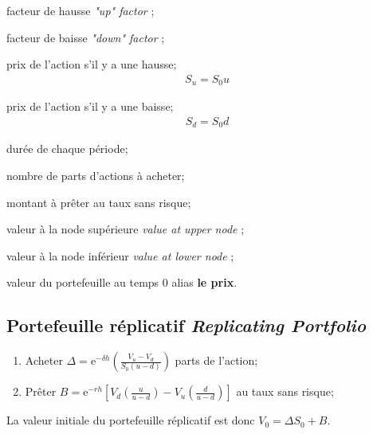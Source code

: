 \documentclass[10pt, french]{article}
\begin{document}
\begin{multicols*}{2}
\begin{distributions}
\begin{description}[leftmargin = *]
	\item[$u$]	facteur de hausse \og \textit{"up" factor} \fg{};
	\item[$d$]	facteur de baisse \og \textit{"down" factor} \fg{};	
	\item[$S_{u}$]	prix de l'action s'il y a une hausse;
		\begin{align*}
		S_{u} = S_{0} u
		\end{align*}
	\item[$S_{d}$]	prix de l'action s'il y a une baisse;
		\begin{align*}
		S_{d} = S_{0} d
		\end{align*}
	\item[$h$]	durée de chaque période;
	\item[$\Delta$]	nombre de parts d'actions à acheter;
	\item[$B$]	montant à prêter au taux sans risque;
	\item[$V_{u}$]	valeur à la node supérieure \og \textit{value at upper node} \fg{};
	\item[$V_{d}$]	valeur à la node inférieur \og \textit{value at lower node} \fg{};
	\item[$V_{0}$]	valeur du portefeuille au temps $0$ alias \textbf{le prix}.
\end{description}
\end{distributions}

\columnbreak
\subsection{Portefeuille réplicatif \og \textit{Replicating Portfolio} \fg{}}

\begin{algo2}
\begin{enumerate}
	\item	Acheter $\Delta	=	\textrm{e}^{-\delta h} \left(\frac{V_{u} - V_{d}}{S_{0}(u - d)}\right)$ parts de l'action;
	\item	Prêter $B	=	\textrm{e}^{-r h} \left[ V_{d}\left(	\frac{u}{u - d}\right) - V_{u} \left(\frac{d}{u - d}\right) \right]$ au taux sans risque;
\end{enumerate}

La valeur initiale du portefeuille réplicatif est donc $V_{0}	=	\Delta S_{0} + B$.
\end{algo2}


\end{multicols*}
\end{document}
